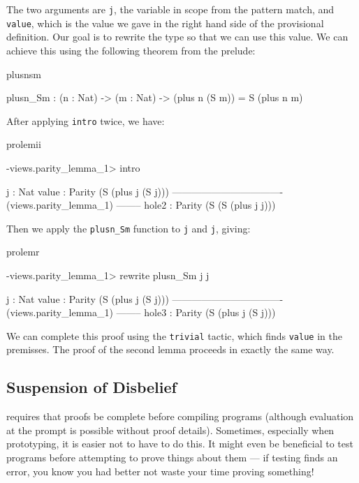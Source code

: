 \noindent
The two arguments are \texttt{j}, the variable in scope from the pattern match,
and \texttt{value}, which is the value we gave in the right hand side of the
provisional definition. Our goal is to rewrite the type so that we can use
this value.
We can achieve this using the following theorem from
the prelude:

\begin{SaveVerbatim}{plusnsm}

plusn_Sm : (n : Nat) -> (m : Nat) -> (plus n (S m)) = S (plus n m)

\end{SaveVerbatim}

\noindent
After applying \texttt{intro} twice, we have:

\begin{SaveVerbatim}{prolemii}

-views.parity_lemma_1> intro 

  j : Nat
  value : Parity (S (plus j (S j)))
---------------------------------- (views.parity_lemma_1) --------
{hole2} : Parity (S (S (plus j j)))

\end{SaveVerbatim}

\noindent
Then we apply the \texttt{plusn\_Sm} function to \texttt{j} and \texttt{j}, giving:

\begin{SaveVerbatim}{prolemr}

-views.parity_lemma_1> rewrite plusn_Sm j j 
 
  j : Nat
  value : Parity (S (plus j (S j)))
---------------------------------- (views.parity_lemma_1) --------
{hole3} : Parity (S (plus j (S j)))

\end{SaveVerbatim}

\noindent
We can complete this proof using the \texttt{trivial} tactic, which finds 
\texttt{value} in the premisses. The proof of the second lemma proceeds in
exactly the same way.

\subsection{Suspension of Disbelief}

\Idris{} requires that proofs be complete before compiling programs (although
evaluation at the prompt is possible without proof details). Sometimes,
especially when prototyping, it is easier not to have to do this. It might even
be beneficial to test programs before attempting to prove things about them ---
if testing finds an error, you know you had better not waste your time proving
something!

